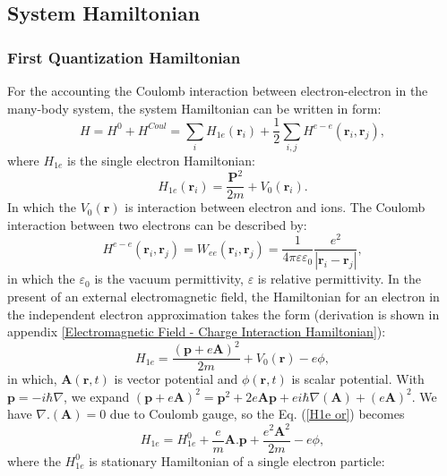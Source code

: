 \documentclass[12pt,english,a4paper]{article}
\begin{document}
	\subsection{System Hamiltonian}
	\subsubsection{First Quantization Hamiltonian}
	\quad For the accounting the Coulomb interaction between electron-electron in the many-body system, the system Hamiltonian can be written in form:
	\begin{equation}
		H = H^0 +H^{Coul} = \sum_{i}H_{1e}(\textbf{r}_i) + \frac{1}{2}\sum_{i,j}H^{e-e}(\textbf{r}_i, \textbf{r}_j),
	\end{equation}
	\quad where $H_{1e}$ is the single electron Hamiltonian:
	\begin{equation}
		H_{1e}(\textbf{r}_i) = \frac{\textbf{P}^2}{2m} + V_0(\textbf{r}_i).
	\end{equation}
	\quad In which the $V_0 (\textbf{r})$ is interaction between electron and ions. The Coulomb interaction between two electrons can be described by:
	\begin{equation}
		\label{H ee}
		H^{e-e}(\textbf{r}_i, \textbf{r}_j) = W_{ee}(\textbf{r}_i, \textbf{r}_j) = \frac{1}{4\pi \varepsilon \varepsilon_0}\frac{e^2}{|\textbf{r}_i-\textbf{r}_j|},
	\end{equation}
	in which the $\varepsilon_0$ is the vacuum permittivity, $\varepsilon$ is relative permittivity. In the present of an external electromagnetic field, the Hamiltonian for an electron in the independent electron approximation takes the form (derivation is shown in appendix \ref{Electromagnetic Field - Charge Interaction Hamiltonian}):
	\begin{equation}
		\label{H1e or}
		H_{1e} = \frac{(\textbf{p} + e \textbf{A})^2}{2m} + V_0(\textbf{r}) -e\phi,
	\end{equation}
	in which, $\textbf{A}(\textbf{r},t)$ is vector potential and $\phi(\textbf{r},t)$ is scalar potential. With $\textbf{p} = - i\hbar\nabla$, we expand $(\textbf{p}+e\textbf{A})^2 = \textbf{p}^2 + 2e\textbf{A}\textbf{p} + ei \hbar \nabla(\textbf{A}) + (e\textbf{A})^2$. We have $\nabla.(\textbf{A}) = 0$ due to Coulomb gauge, so the Eq. (\ref{H1e or}) becomes
	\begin{equation}
		\label{expand H1e}
		H_{1e} = H^0_{1e} + \frac{e}{m} \textbf{A}.\textbf{p} + \frac{e^2 \textbf{A}^2}{2m} - e\phi,
	\end{equation}
	where the $H^0_{1e}$ is stationary Hamiltonian of a single electron particle:
\end{document}
